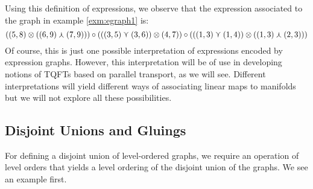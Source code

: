 \documentclass[./Thick_TQFTs_and_Quantum_Information.tex]{subfiles}
\begin{document}
Using this definition of expressions, we observe that the expression associated
to the graph in example \ref{exm:egraph1} is:
\[
  ((5, 8) \otimes ((6, 9) \curlywedge (7, 9)))
  \circ (((3, 5) \curlyvee (3, 6)) \otimes (4, 7))
  \circ (((1, 3) \curlyvee (1, 4)) \otimes ((1, 3) \curlywedge (2, 3)))
\]
Of course, this is just one possible interpretation of expressions encoded by
expression graphs. However, this interpretation will be of use in developing
notions of TQFTs based on parallel transport, as we will see. Different
interpretations will yield different ways of associating linear maps to
manifolds but we will not explore all these possibilities.

\subsection{Disjoint Unions and Gluings}

For defining a disjoint union of level-ordered graphs, we require an operation
of level orders that yields a level ordering of the disjoint union of the
graphs. We see an example first.
\end{document}
